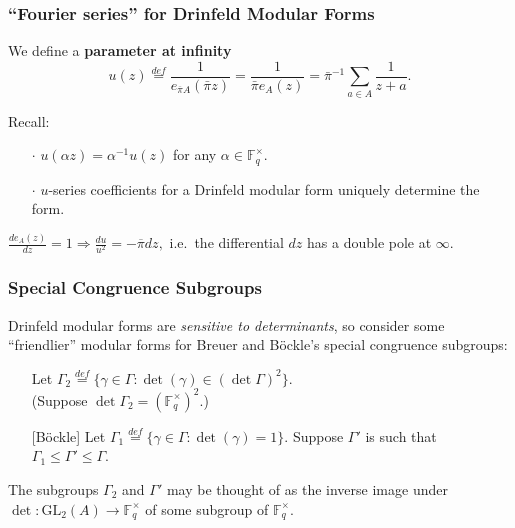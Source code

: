 \documentclass[handout]{beamer}
\numberwithin{equation}{section}
\numberwithin{case}{theorem}
\newcommand{\bbF}{\mathbb{F}}		%
\newcommand{\GL}{\mathrm{GL}} 	%
\newcommand{\<}{\left\langle}
\renewcommand{\>}{\right\rangle}
\begin{document}
	\begin{frame}
		\frametitle{``Fourier series'' for Drinfeld Modular Forms}
		\begin{definition}\label{d: parameter at infty}
			We define a \textbf{parameter at infinity} 
			\[u(z)\overset{def}{=}\frac{1}{e_{\overline{\pi}A}(\bar{\pi}z)}=\frac{1}{\bar{\pi}e_A(z)}=\bar{\pi}^{-1}\sum_{a\in A}\frac{1}{z+a}.\]
			
			\pause 
			
			Recall:
			\begin{itemize}
				\item[$\cdot$] $\displaystyle{u\left(\alpha z\right)=\alpha^{-1}u(z)}$ for any $\alpha\in \bbF_q^{\times}.$ \pause
				\item[$\cdot$] $u$-series coefficients for a Drinfeld modular form uniquely determine the form. 
			\end{itemize}
		\end{definition}
		
		
		\pause 
		\begin{lemma}
			$\displaystyle{\frac{de_A(z)}{dz}=1\Rightarrow \frac{du}{u^2} = -\overline{\pi}dz,}$ i.e.\ the differential $dz$ has a double pole at $\infty.$
		\end{lemma}
	\end{frame}
	
	\begin{frame}
		\frametitle{Special Congruence Subgroups}
		Drinfeld modular forms are \emph{sensitive to determinants}, so consider some ``friendlier'' modular forms for Breuer and B\"ockle's special congruence subgroups:\pause
		
		\begin{itemize}
			\item[]\cite{Breuer-Gekeler-h-function} Let $\Gamma_2\overset{def}{=}\{\gamma\in \Gamma:\det(\gamma)\in (\det\Gamma)^2\}.$\\ \quad (Suppose $\det\Gamma_2=(\bbF_q^{\times})^2.$) \pause
			\item[][B\"ockle] Let $\Gamma_1\overset{def}{=}\{\gamma\in \Gamma: \det(\gamma)=1\}.$ Suppose $\Gamma'$ is such that $\Gamma_1\leq \Gamma'\leq \Gamma.$
		\end{itemize}
		
		\pause
		The subgroups $\Gamma_2$ and $\Gamma'$ may be thought of as the inverse image under $\det:\GL_2(A)\to \bbF_q^{\times}$ of some subgroup of $\bbF_q^{\times}.$ 
	\end{frame}
	
\end{document}
